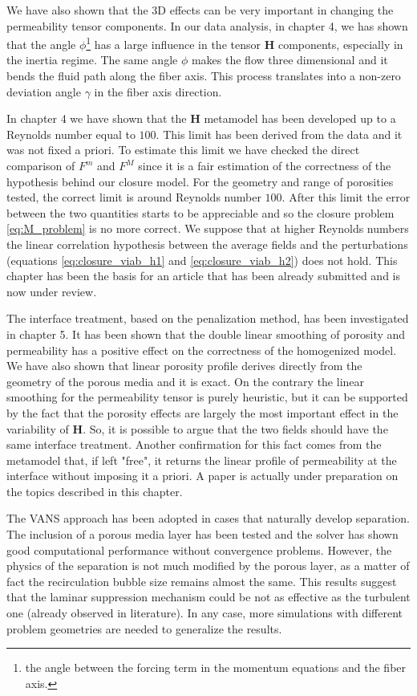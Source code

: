 We have also shown that the 3D effects can be very important in changing the permeability tensor components. In our data analysis, in chapter 4, we has shown that the angle $\phi$\footnote{the angle between the forcing term in the momentum equations and the fiber axis.} has a large influence in the tensor $\mathbf{H}$ components, especially in the inertia regime.
The same angle $\phi$ makes the flow three dimensional and it bends the fluid path along the fiber axis. This process translates into a non-zero deviation angle $\gamma$ in the fiber axis direction.

In chapter 4 we have shown that the $\mathbf{H}$ metamodel has been developed up to a Reynolds number equal to $100$. This limit has been derived from the data and it was not fixed a priori. To estimate this limit we have checked the direct comparison of $F^m$ and $F^M$ since it is a fair estimation of the correctness of the hypothesis behind our closure model. For the geometry and range of porosities tested, the correct limit is around Reynolds number $100$. After this limit the error between the two quantities starts to be appreciable and so the closure problem \eqref{eq:M_problem} is no more correct. We suppose that at higher Reynolds numbers the linear correlation hypothesis between the average fields and the perturbations (equations \eqref{eq:closure_viab_h1} and \eqref{eq:closure_viab_h2}) does not hold.
This chapter has been the basis for an article that has been already submitted and is now under review.

The interface treatment, based on the penalization method, has been investigated in chapter 5. It has been shown that the double linear smoothing of porosity and permeability has a positive effect on the correctness of the homogenized model. We have also shown that linear porosity profile derives directly from the geometry of the porous media and it is exact. On the contrary the linear smoothing for the permeability tensor is purely heuristic, but it can be supported by the fact that the porosity effects are largely the most important effect in the variability of $\mathbf{H}$. So, it is possible to argue that the two fields should have the same interface treatment. Another confirmation for this fact comes from the metamodel that, if left "free", it returns the linear profile of permeability at the interface without imposing it a priori. A paper is actually under preparation on the topics described in this chapter.
 
The VANS approach has been adopted in cases that naturally develop separation. The inclusion of a porous media layer has been tested and the solver has shown good computational performance without convergence problems. However, the physics of the separation is not much modified by the porous layer, as a matter of fact the recirculation bubble size remains almost the same. This results suggest that the laminar suppression mechanism could be not as effective as the turbulent one (already observed in literature). In any case, more simulations with different problem geometries are needed to generalize the results.

